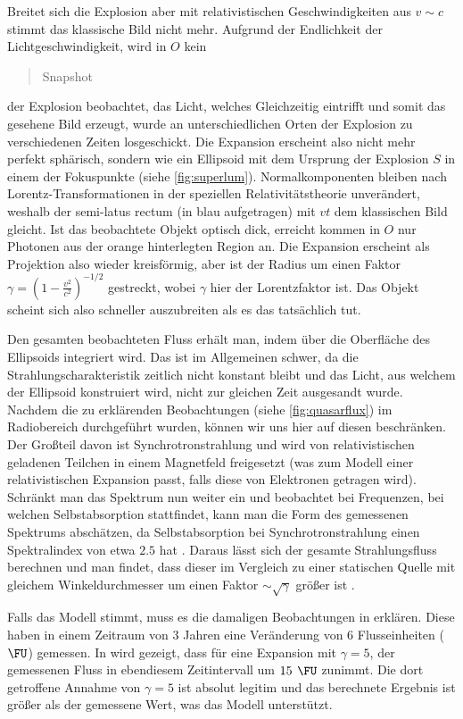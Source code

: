 Breitet sich die Explosion aber mit relativistischen Geschwindigkeiten aus \( v \sim c \) stimmt das klassische Bild nicht mehr. Aufgrund der Endlichkeit der Lichtgeschwindigkeit, wird in \( O \) kein \blockquote{Snapshot} der Explosion beobachtet, das Licht, welches Gleichzeitig eintrifft und somit das gesehene Bild erzeugt, wurde an unterschiedlichen Orten der Explosion zu verschiedenen Zeiten losgeschickt. Die Expansion erscheint also nicht mehr perfekt sphärisch, sondern wie ein Ellipsoid mit dem Ursprung der Explosion \( S \) in einem der Fokuspunkte (siehe \autoref{fig:superlum}). Normalkomponenten bleiben nach Lorentz-Transformationen in der speziellen Relativitätstheorie unverändert, weshalb der semi-latus rectum (in blau aufgetragen) mit \( vt \) dem klassischen Bild gleicht. Ist das beobachtete Objekt optisch dick, erreicht kommen in \( O \) nur Photonen aus der orange hinterlegten Region an. Die Expansion erscheint als Projektion also wieder kreisförmig, aber ist der Radius um einen Faktor \( \gamma = \left( 1-\tfrac{v^2}{c^2} \right)^{-1/2} \) gestreckt, wobei \( \gamma \) hier der Lorentzfaktor ist. Das Objekt scheint sich also schneller auszubreiten als es das tatsächlich tut.	

Den gesamten beobachteten Fluss erhält man, indem über die Oberfläche des Ellipsoids integriert wird. Das ist im Allgemeinen schwer, da die Strahlungscharakteristik zeitlich nicht konstant bleibt und das Licht, aus welchem der Ellipsoid konstruiert wird, nicht zur gleichen Zeit ausgesandt wurde. Nachdem die zu erklärenden Beobachtungen (siehe \autoref{fig:quasarflux}) im Radiobereich durchgeführt wurden, können wir uns hier auf diesen beschränken. Der Großteil davon ist Synchrotronstrahlung und wird von relativistischen geladenen Teilchen in einem Magnetfeld freigesetzt (was zum Modell einer relativistischen Expansion passt, falls diese von Elektronen getragen wird). Schränkt man das Spektrum nun weiter ein und beobachtet bei Frequenzen, bei welchen Selbstabsorption stattfindet, kann man die Form des gemessenen Spektrums abschätzen, da Selbstabsorption bei Synchrotronstrahlung einen Spektralindex von etwa \( 2.5 \) hat \autocite{spectral}. Daraus lässt sich der gesamte Strahlungsfluss berechnen und man findet, dass dieser im Vergleich zu einer statischen Quelle mit gleichem Winkeldurchmesser um einen Faktor \( \sim\sqrt{\gamma } \) größer ist \autocite{rees}.

Falls das Modell stimmt, muss es die damaligen Beobachtungen in \autocite{oldflux} erklären. Diese haben in einem Zeitraum von 3 Jahren eine Veränderung von 6 Flusseinheiten (\( \oldunit{\FU} \)) gemessen. In \autocite{rees} wird gezeigt, dass für eine Expansion mit \( \gamma = 5 \), der gemessenen Fluss in ebendiesem Zeitintervall um \( 15 \unit{\FU} \) zunimmt. Die dort getroffene Annahme von \( \gamma = 5 \) ist absolut legitim und das berechnete Ergebnis ist größer als der gemessene Wert, was das Modell unterstützt. 

